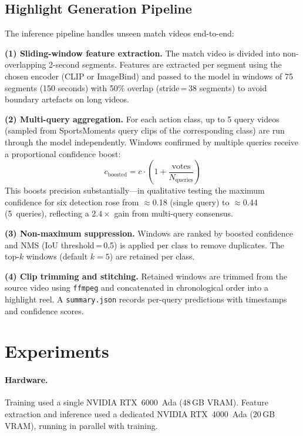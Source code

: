 \documentclass[10pt,twocolumn]{article}
\begin{document}
\subsection{Highlight Generation Pipeline}

The inference pipeline handles unseen match videos end-to-end:

\textbf{(1) Sliding-window feature extraction.}
The match video is divided into non-overlapping 2-second segments. Features are
extracted per segment using the chosen encoder (CLIP or ImageBind) and passed
to the model in windows of 75 segments (150 seconds) with 50\% overlap
(stride\,=\,38 segments) to avoid boundary artefacts on long videos.

\textbf{(2) Multi-query aggregation.}
For each action class, up to 5 query videos (sampled from SportsMoments query
clips of the corresponding class) are run through the model independently.
Windows confirmed by multiple queries receive a proportional confidence boost:
\begin{equation}
  c_{\text{boosted}} = c \cdot \left(1 + \frac{\text{votes}}{N_{\text{queries}}}\right)
\end{equation}
This boosts precision substantially—in qualitative testing the maximum
confidence for six detection rose from $\approx$0.18 (single query) to
$\approx$0.44 (5~queries), reflecting a $2.4\times$ gain from multi-query
consensus.

\textbf{(3) Non-maximum suppression.}
Windows are ranked by boosted confidence and NMS (IoU threshold\,=\,0.5) is
applied per class to remove duplicates. The top-$k$ windows (default $k{=}5$)
are retained per class.

\textbf{(4) Clip trimming and stitching.}
Retained windows are trimmed from the source video using \texttt{ffmpeg} and
concatenated in chronological order into a highlight reel. A
\texttt{summary.json} records per-query predictions with timestamps and
confidence scores.

\section{Experiments}

\paragraph{Hardware.}
Training used a single NVIDIA RTX~6000~Ada (48\,GB VRAM). Feature extraction
and inference used a dedicated NVIDIA RTX~4000~Ada (20\,GB VRAM), running in
parallel with training.
\end{document}

